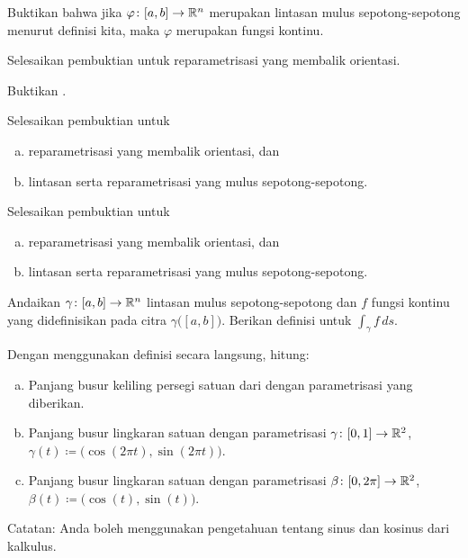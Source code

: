 \begin{exercise}
Buktikan bahwa jika $\varphi \colon [a,b] \to {\mathbb{R}}^n$ merupakan lintasan mulus
sepotong-sepotong menurut definisi kita, maka $\varphi$ merupakan fungsi kontinu.
\end{exercise}

\begin{exercise}
Selesaikan pembuktian  untuk reparametrisasi
yang membalik orientasi.
\end{exercise}

\begin{exercise}
Buktikan .
\end{exercise}

\begin{exercise} \label{mv:exercise:pathpiece}
Selesaikan pembuktian 
untuk
\begin{enumerate}[a)]
\item
reparametrisasi yang membalik orientasi, dan
\item
lintasan serta reparametrisasi yang mulus
sepotong-sepotong.
\end{enumerate}
\end{exercise}

\begin{exercise} \label{mv:exercise:linepiece}
Selesaikan pembuktian 
untuk
\begin{enumerate}[a)]
\item
reparametrisasi yang membalik orientasi, dan
\item
lintasan serta reparametrisasi yang mulus
sepotong-sepotong.
\end{enumerate}
\end{exercise}

\begin{exercise}
Andaikan $\gamma \colon [a,b] \to {\mathbb{R}}^n$ lintasan mulus sepotong-sepotong dan $f$
fungsi kontinu yang didefinisikan pada citra $\gamma\bigl([a,b]\bigr)$.
Berikan definisi untuk $\int_{\gamma} f \,ds$.
\end{exercise}

\begin{exercise}
Dengan menggunakan definisi secara langsung, hitung:
\begin{enumerate}[a)]
\item
Panjang busur keliling persegi satuan dari
 dengan parametrisasi yang diberikan.
\item
Panjang busur lingkaran satuan dengan parametrisasi
$\gamma \colon [0,1] \to {\mathbb{R}}^2$, $\gamma(t) \coloneqq \bigl(\cos(2\pi t),\sin(2\pi t)\bigr)$.
\item
Panjang busur lingkaran satuan dengan parametrisasi
$\beta \colon [0,2\pi] \to {\mathbb{R}}^2$, $\beta(t) \coloneqq \bigl(\cos(t),\sin(t)\bigr)$.
\end{enumerate}
Catatan: Anda boleh menggunakan pengetahuan tentang sinus dan kosinus dari kalkulus.
\end{exercise}

